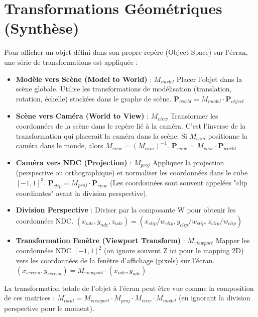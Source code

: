 \section{Transformations Géométriques (Synthèse)}
Pour afficher un objet défini dans son propre repère (Object Space) sur l'écran, une série de transformations est appliquée :
\begin{itemize}
\item  \textbf{Modèle vers Scène (Model to World)} : \( M_{model} \)
    Placer l'objet dans la scène globale. Utilise les transformations de modélisation (translation, rotation, échelle) stockées dans le graphe de scène.
    \( \mathbf{P}_{world} = M_{model} \cdot \mathbf{P}_{object} \)
\item  \textbf{Scène vers Caméra (World to View)} : \( M_{view} \)
    Transformer les coordonnées de la scène dans le repère lié à la caméra. C'est l'inverse de la transformation qui placerait la caméra dans la scène. Si \( M_{cam} \) positionne la caméra dans le monde, alors \( M_{view} = (M_{cam})^{-1} \).
    \( \mathbf{P}_{view} = M_{view} \cdot \mathbf{P}_{world} \)
\item  \textbf{Caméra vers NDC (Projection)} : \( M_{proj} \)
    Appliquer la projection (perspective ou orthographique) et normaliser les coordonnées dans le cube $[-1, 1]^3$.
    \( \mathbf{P}_{clip} = M_{proj} \cdot \mathbf{P}_{view} \)
    (Les coordonnées sont souvent appelées "clip coordinates" avant la division perspective).
\item  \textbf{Division Perspective} :
    Diviser par la composante W pour obtenir les coordonnées NDC.
    \( (x_{ndc}, y_{ndc}, z_{ndc}) = (x_{clip}/w_{clip}, y_{clip}/w_{clip}, z_{clip}/w_{clip}) \)
\item  \textbf{Transformation Fenêtre (Viewport Transform)} : \( M_{viewport} \)
    Mapper les coordonnées NDC $[-1, 1]^2$ (on ignore souvent Z ici pour le mapping 2D) vers les coordonnées de la fenêtre d'affichage (pixels) sur l'écran.
    \( (x_{screen}, y_{screen}) = M_{viewport} \cdot (x_{ndc}, y_{ndc}) \)
\end{itemize}
La transformation totale de l'objet à l'écran peut être vue comme la composition de ces matrices :
\( M_{total} = M_{viewport} \cdot M_{proj} \cdot M_{view} \cdot M_{model} \) (en ignorant la division perspective pour le moment).
